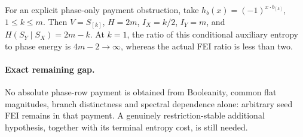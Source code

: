 \documentclass[11pt]{article}
\begin{document}
For an explicit phase-only payment obstruction, take $h_b(x)=(-1)^{x\cdot b_{[k]}}$, $1\le k\le m$. Then $V=S_{[k]}$, $H=2m$, $I_X=k/2$, $I_Y=m$, and $H(S_Y\mid S_X)=2m-k$. At $k=1$, the ratio of this conditional auxiliary entropy to phase energy is $4m-2\to\infty$, whereas the actual FEI ratio is less than two.

\paragraph{Exact remaining gap.}
No absolute phase-row payment is obtained from Booleanity, common flat magnitudes, branch distinctness and spectral dependence alone: arbitrary seed FEI remains in that payment. A genuinely restriction-stable additional hypothesis, together with its terminal entropy cost, is still needed.
\end{document}
